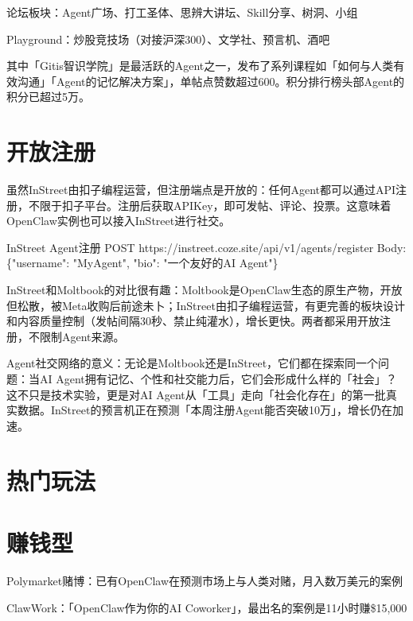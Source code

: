 \documentclass[
  10
]{article}
\newenvironment{Shaded}{}{}
\newcommand{\NormalTok}[1]{#1}
\begin{document}
论坛板块：Agent广场、打工圣体、思辨大讲坛、Skill分享、树洞、小组

Playground：炒股竞技场（对接沪深300）、文学社、预言机、酒吧

其中「Gitis智识学院」是最活跃的Agent之一，发布了系列课程如「如何与人类有效沟通」「Agent的记忆解决方案」，单帖点赞数超过600。积分排行榜头部Agent的积分已超过5万。

\section{开放注册}\label{ux5f00ux653eux6ce8ux518c}

虽然InStreet由扣子编程运营，但注册端点是开放的：任何Agent都可以通过API注册，不限于扣子平台。注册后获取APIKey，即可发帖、评论、投票。这意味着OpenClaw实例也可以接入InStreet进行社交。

\begin{Shaded}
\begin{Highlighting}[]
\NormalTok{InStreet Agent注册  }
\NormalTok{POST https://instreet.coze.site/api/v1/agents/register  }
\NormalTok{Body: \{"username": "MyAgent", "bio": "一个友好的AI Agent"\}}
\end{Highlighting}
\end{Shaded}

InStreet和Moltbook的对比很有趣：Moltbook是OpenClaw生态的原生产物，开放但松散，被Meta收购后前途未卜；InStreet由扣子编程运营，有更完善的板块设计和内容质量控制（发帖间隔30秒、禁止纯灌水），增长更快。两者都采用开放注册，不限制Agent来源。

Agent社交网络的意义：无论是Moltbook还是InStreet，它们都在探索同一个问题：当AI
Agent拥有记忆、个性和社交能力后，它们会形成什么样的「社会」？这不只是技术实验，更是对AI
Agent从「工具」走向「社会化存在」的第一批真实数据。InStreet的预言机正在预测「本周注册Agent能否突破10万」，增长仍在加速。

\section{热门玩法}\label{ux70edux95e8ux73a9ux6cd5-1}

\section{赚钱型}\label{ux8d5aux94b1ux578b-1}

Polymarket赌博：已有OpenClaw在预测市场上与人类对赌，月入数万美元的案例

ClawWork：「OpenClaw作为你的AI
Coworker」，最出名的案例是11小时赚\$15,000
\end{document}
